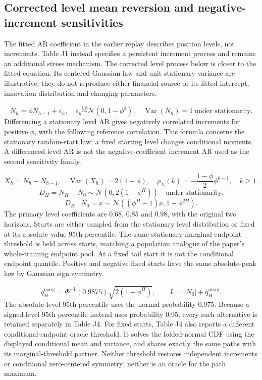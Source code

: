\documentclass[10pt,a4paper]{article}
\begin{document}
\subsection*{Corrected level mean reversion and negative-increment sensitivities}
The fitted AR coefficient in the earlier replay describes position levels, not increments. Table J1 instead specifies a persistent increment process and remains an additional stress mechanism. The corrected level process below is closer to the fitted equation. Its centered Gaussian law and unit stationary variance are illustrative; they do not reproduce either financial source or its fitted intercept, innovation distribution and changing parameters.

\[
N_h=\phi N_{h-1}+\varepsilon_h,\quad\varepsilon_h\overset{\mathrm{iid}}\sim\mathcal N(0,1-\phi^2),\quad\operatorname{Var}(N_h)=1\ \text{under stationarity}.
\]
Differencing a stationary level AR gives negatively correlated increments for positive \(\phi\), with the following reference correlation. This formula concerns the stationary random-start law; a fixed starting level changes conditional moments. A differenced level AR is not the negative-coefficient increment AR used as the second sensitivity family.

\[
X_h=N_h-N_{h-1},\quad\operatorname{Var}(X_h)=2(1-\phi),\quad\rho_X(k)=-\frac{1-\phi}{2}\phi^{k-1},\quad k\ge1.
\]
\[
D_H=N_H-N_0\sim\mathcal N\!\left(0,2(1-\phi^H)\right)\quad\text{under stationarity}.
\]
\[
D_H\mid N_0=x\sim\mathcal N\!\left((\phi^H-1)x,1-\phi^{2H}\right).
\]
The primary level coefficients are 0.68, 0.85 and 0.98, with the original two horizons. Starts are either sampled from the stationary level distribution or fixed at its absolute-value 95th percentile. The same stationary-marginal endpoint threshold is held across starts, matching a population analogue of the paper's whole-training endpoint pool. At a fixed tail start it is not the conditional endpoint quantile. Positive and negative fixed starts have the same absolute-peak law by Gaussian sign symmetry.

\[
q_H^{\mathrm{marg}}=\Phi^{-1}(0.9875)\sqrt{2(1-\phi^H)},\qquad L=|N_0|+q_H^{\mathrm{marg}}.
\]
The absolute-level 95th percentile uses the normal probability 0.975. Because a signed-level 95th percentile instead uses probability 0.95, every such alternative is retained separately in Table J4. For fixed starts, Table J4 also reports a different conditional-endpoint oracle threshold. It solves the folded-normal CDF using the displayed conditional mean and variance, and shares exactly the same paths with its marginal-threshold partner. Neither threshold restores independent increments or conditional zero-centered symmetry; neither is an oracle for the path maximum.
\end{document}
